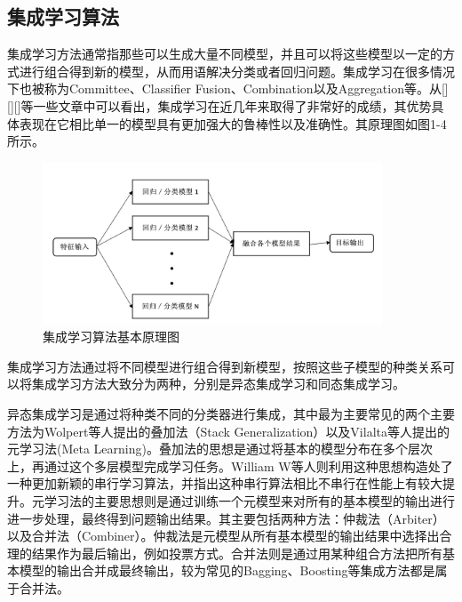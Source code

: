 \subsection{集成学习算法} %

集成学习方法通常指那些可以生成大量不同模型，并且可以将这些模型以一定的方式进行组合得到新的模型，从而用语解决分类或者回归问题\cite{mendes2012ensemble}。集成学习在很多情况下也被称为Committee、Classifier Fusion、Combination以及Aggregation等\cite{valentini2002ensembles}。从[][][]等一些文章中可以看出，集成学习在近几年来取得了非常好的成绩，其优势具体表现在它相比单一的模型具有更加强大的鲁棒性以及准确性\cite{garcia2005cooperative}。其原理图如图1-4所示。

\begin{figure}[htb]
	\centering 
	\includegraphics[width=0.9\textwidth]{./mypic/集成学习算法基本原理图.jpg} 
	\caption{集成学习算法基本原理图} 
\end{figure}


集成学习方法通过将不同模型进行组合得到新模型，按照这些子模型的种类关系可以将集成学习方法大致分为两种，分别是异态集成学习和同态集成学习。

异态集成学习是通过将种类不同的分类器进行集成，其中最为主要常见的两个主要方法为Wolpert等人提出的叠加法（Stack Generalization）\cite{wolpert1992stacked}以及Vilalta等人提出的元学习法(Meta Learning)\cite{vilalta2002perspective}。叠加法的思想是通过将基本的模型分布在多个层次上，再通过这个多层模型完成学习任务。William W等人则利用这种思想构造处了一种更加新颖的串行学习算法，并指出这种串行算法相比不串行在性能上有较大提升\cite{cohen2005stacked}。元学习法的主要思想则是通过训练一个元模型来对所有的基本模型的输出进行进一步处理，最终得到问题输出结果。其主要包括两种方法：仲裁法（Arbiter）以及合并法（Combiner）。仲裁法是元模型从所有基本模型的输出结果中选择出合理的结果作为最后输出，例如投票方式。合并法则是通过用某种组合方法把所有基本模型的输出合并成最终输出，较为常见的Bagging\cite{breiman1996bagging}、Boosting\cite{schapire1990strength}等集成方法都是属于合并法。

